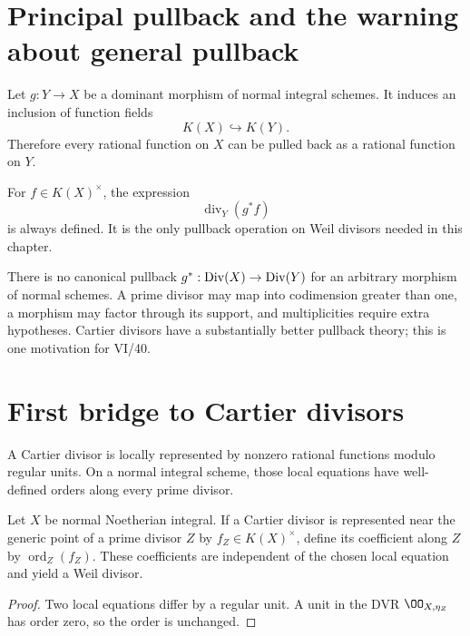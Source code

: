 \section{Principal pullback and the warning about general pullback}
Let \(g:Y\to X\) be a dominant morphism of normal integral schemes.  It induces an inclusion of function fields
\[
 K(X)\hookrightarrow K(Y).
\]
Therefore every rational function on \(X\) can be pulled back as a rational function on \(Y\).

\begin{proposition}\label{prop:vi39-principal-pullback}
For \(f\in K(X)^\times\), the expression
\[
 \operatorname{div}_Y(g^*f)
\]
is always defined.  It is the only pullback operation on Weil divisors needed in this chapter.
\end{proposition}

\begin{warning}\label{warn:vi39-no-naive-pullback}
There is no canonical pullback \(g^*:\operatorname{Div}(X)\to\operatorname{Div}(Y)\) for an arbitrary morphism of normal schemes.  A prime divisor may map into codimension greater than one, a morphism may factor through its support, and multiplicities require extra hypotheses.  Cartier divisors have a substantially better pullback theory; this is one motivation for VI/40.
\end{warning}



\section{First bridge to Cartier divisors}
A Cartier divisor is locally represented by nonzero rational functions modulo regular units.  On a normal integral scheme, those local equations have well-defined orders along every prime divisor.

\begin{proposition}\label{prop:vi39-cartier-weil-preview}
Let \(X\) be normal Noetherian integral.  If a Cartier divisor is represented near the generic point of a prime divisor \(Z\) by \(f_Z\in K(X)^\times\), define its coefficient along \(Z\) by \(\operatorname{ord}_Z(f_Z)\).  These coefficients are independent of the chosen local equation and yield a Weil divisor.
\end{proposition}

\begin{proof}
Two local equations differ by a regular unit.  A unit in the DVR \(\OO_{X,\eta_Z}\) has order zero, so the order is unchanged.
\end{proof}

